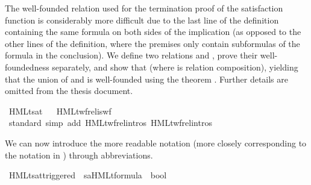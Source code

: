 \begin{isabellebody}
\endisatagproof
{\isafoldproof}%
%
\isadelimproof
%
\endisadelimproof
%
\begin{isamarkuptext}%
The well-founded relation used for the termination proof of the satisfaction function is considerably more difficult due to the last line of the definition containing the same formula on both sides of the implication (as opposed to the other lines of the definition, where the premises only contain subformulas of the formula in the conclusion). We define two relations  and , prove their well-foundedness separately, and show that  (where  is relation composition), yielding that the union of  and  is well-founded using the theorem . Further details are omitted from the thesis document.%
\end{isamarkuptext}\isamarkuptrue%
%
\isadelimunimportant
%
\endisadelimunimportant
%
\isatagunimportant
%
\endisatagunimportant
{\isafoldunimportant}%
%
\isadelimunimportant
\isanewline
%
\endisadelimunimportant
{}\isamarkupfalse%
\ HMLt{\isacharunderscore}{\kern0pt}sat%
\isadelimproof
\ %
\endisadelimproof
%
\isatagproof
{}\isamarkupfalse%
\ HMLt{\isacharunderscore}{\kern0pt}wf{\isacharunderscore}{\kern0pt}rel{\isacharunderscore}{\kern0pt}is{\isacharunderscore}{\kern0pt}wf\ \isamarkupfalse%
\ {\isacharparenleft}{\kern0pt}standard{\isacharcomma}{\kern0pt}\ {\isacharparenleft}{\kern0pt}simp\ add{\isacharcolon}{\kern0pt}\ HMLt{\isacharunderscore}{\kern0pt}wf{\isacharunderscore}{\kern0pt}rel{\isacharunderscore}{\kern0pt}{}{\isachardot}{\kern0pt}intros\ HMLt{\isacharunderscore}{\kern0pt}wf{\isacharunderscore}{\kern0pt}rel{\isacharunderscore}{\kern0pt}{}{\isachardot}{\kern0pt}intros{\isacharparenright}{\kern0pt}{\isacharplus}{\kern0pt}{\isacharparenright}{\kern0pt}%
\endisatagproof
{\isafoldproof}%
%
\isadelimproof
%
\endisadelimproof
%
\begin{isamarkuptext}%
We can now introduce the more readable notation (more closely corresponding to the notation in \cite{rbs}) through abbreviations.%
\end{isamarkuptext}\isamarkuptrue%
\isamarkupfalse%
\ HMLt{\isacharunderscore}{\kern0pt}sat{\isacharunderscore}{\kern0pt}triggered\ {\isacharcolon}{\kern0pt}{\isacharcolon}{\kern0pt}\ {\isacartoucheopen}{\isacharprime}{\kern0pt}s{\isasymRightarrow}{\isacharparenleft}{\kern0pt}{\isacharprime}{\kern0pt}a{\isacharparenright}{\kern0pt}HMLt{\isacharunderscore}{\kern0pt}formula\ {\isasymRightarrow}\ bool{\isacartoucheclose}\ \isanewline

\end{isabellebody}
